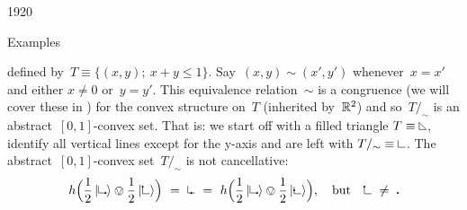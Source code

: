 \begin{parsec}{1920}
\begin{point}{50}{Examples}
\begin{enumerate}
    defined by~$T \equiv \{ (x,y);\ x+y \leq 1\}$.
Say~$(x,y) \sim (x',y')$
    whenever~$x = x'$ and either $x\neq 0$ or~$y=y'$.
This equivalence relation~$\sim$
is a congruence (we will cover these in )
        for the convex structure on~$T$
    (inherited by~$\mathbb{R}^2$)
    and so~$T /_\sim$ is an abstract~$[0,1]$-convex set.
That is: we start off with a filled triangle
$T \equiv \begin{tikzpicture}[scale=0.2]
    \draw (0,0) -- (0,1) ; 
    \draw (1,0) -- (0,0) ; 
    \draw (1,0) -- (0,1) ; 
\end{tikzpicture}$,
identify all vertical lines
except for the y-axis
and are left with
$T/_\sim \equiv
\begin{tikzpicture}[scale=0.2]
    \draw (0,0) -- (0,1) ; 
    \draw (1,0) -- (0,0) ; 
\end{tikzpicture}$.
The abstract~$[0,1]$-convex set~$T/_\sim$
    is not cancellative:
\begin{equation*}
    h\Bigl( 
    \frac{1}{2}\ket{\begin{tikzpicture}[scale=0.2]
    \filldraw( 1,0) circle (3pt);
    \draw (0,0) -- (0,1) ; 
    \draw (1,0) -- (0,0) ; 
\end{tikzpicture}}
\ovee
    \frac{1}{2}\ket{\begin{tikzpicture}[scale=0.2]
    \filldraw( 0,1) circle (3pt);
    \draw (0,0) -- (0,1) ; 
    \draw (1,0) -- (0,0) ; 
\end{tikzpicture}} \Bigr)
\ = \
    \begin{tikzpicture}[scale=0.2]
    \filldraw( .5,0) circle (3pt);
    \draw (0,0) -- (0,1) ; 
    \draw (1,0) -- (0,0) ; 
\end{tikzpicture}
\ = \ 
h \Bigl(\frac{1}{2}\ket{\begin{tikzpicture}[scale=0.2]
    \filldraw( 1,0) circle (3pt);
    \draw (0,0) -- (0,1) ; 
    \draw (1,0) -- (0,0) ; 
\end{tikzpicture}}
\ovee
    \frac{1}{2}\ket{
        \begin{tikzpicture}[scale=0.2]
    \filldraw( 0,.5) circle (3pt);
    \draw (0,0) -- (0,1) ; 
    \draw (1,0) -- (0,0) ; 
\end{tikzpicture}
}\Bigr), \quad\text{but}\quad
        \begin{tikzpicture}[scale=0.2]
    \filldraw( 0,1) circle (3pt);
    \draw (0,0) -- (0,1) ; 
    \draw (1,0) -- (0,0) ; 
\end{tikzpicture} \ \neq \ 
        \begin{tikzpicture}[scale=0.2]
    \filldraw( 0,.5) circle (3pt);

\end{tikzpicture}
\end{equation*}
\end{enumerate}
\end{point}
\end{parsec}
